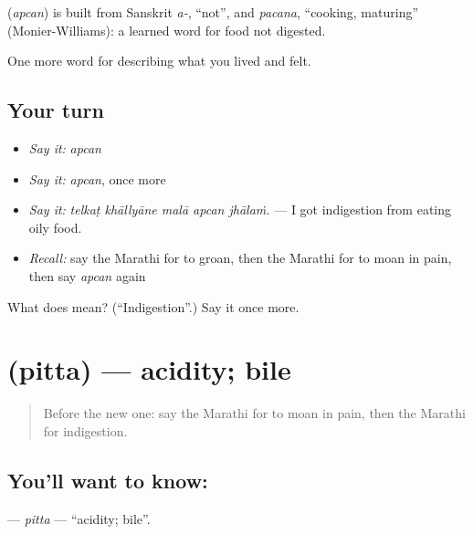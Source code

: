 \begin{cousinweb}
\textbf{} (\emph{apcan}) is built from Sanskrit \emph{a-}, \textquotedblleft{}not\textquotedblright{}, and \emph{pacana}, \textquotedblleft{}cooking, maturing\textquotedblright{} (Monier-Williams): a learned word for food not digested.
\end{cousinweb}

\begin{grammarlens}[title={What you've built}]
One more word for describing what you lived and felt.
\end{grammarlens}

\subsection*{Your turn}
\begin{itemize}
\raggedright
  \item \emph{Say it:} \emph{apcan}
  \item \emph{Say it:} \emph{apcan}, once more
  \item \emph{Say it:} \emph{telkaṭ khāllyāne malā apcan jhālaṁ.} — I got indigestion from eating oily food.
  \item \emph{Recall:} say the Marathi for to groan, then the Marathi for to moan in pain, then say \emph{apcan} again
\end{itemize}

\begin{tcolorbox}[breakable,colback=teal!4,colframe=teal!35!black,title={Before you move on}]
What does  mean? (\textquotedblleft{}Indigestion\textquotedblright{}.) Say it once more.
\end{tcolorbox}
\section[\texorpdfstring{\mr{पित्त} (pitta)}{पित्त (pitta)}]{ (pitta) — acidity; bile}

\label{lesson:MR-C483-pitta}



\begin{quote}
Before the new one: say the Marathi for to moan in pain, then the Marathi for indigestion.
\end{quote}

\subsection*{You'll want to know: }
\textbf{} — \emph{pitta} — \textquotedblleft{}acidity; bile\textquotedblright{}.

